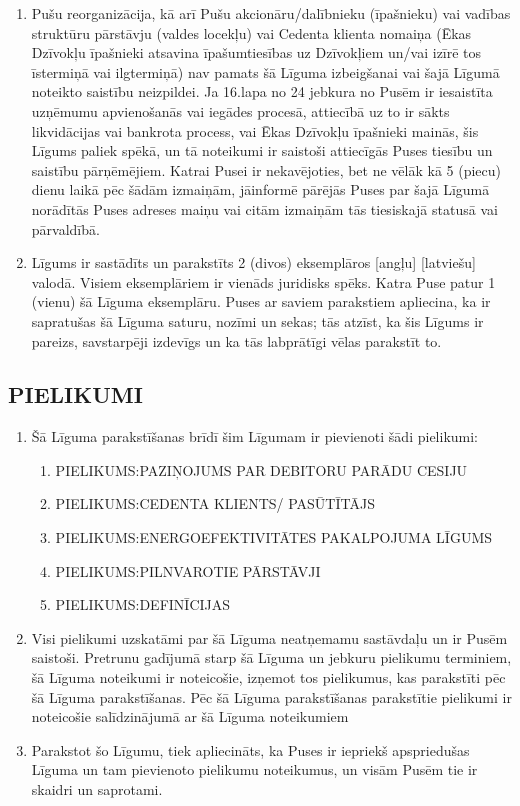\documentclass[a4paper]{article}
\begin{document}
\begin{multicols}{2}
\begin{enumerate}
  \item{Pušu reorganizācija, kā arī Pušu akcionāru/dalībnieku (īpašnieku) vai
vadības struktūru pārstāvju (valdes locekļu) vai Cedenta klienta
nomaiņa (Ēkas Dzīvokļu īpašnieki atsavina īpašumtiesības uz
Dzīvokļiem un/vai izīrē tos īstermiņā vai ilgtermiņā) nav pamats šā
Līguma izbeigšanai vai šajā Līgumā noteikto saistību neizpildei. Ja
16.lapa no 24 jebkura no Pusēm ir iesaistīta uzņēmumu apvienošanās vai iegādes
procesā, attiecībā uz to ir sākts likvidācijas vai bankrota process, vai
Ēkas Dzīvokļu īpašnieki mainās, šis Līgums paliek spēkā, un tā
noteikumi ir saistoši attiecīgās Puses tiesību un saistību
pārņēmējiem. Katrai Pusei ir nekavējoties, bet ne vēlāk kā 5 (piecu)
dienu laikā pēc šādām izmaiņām, jāinformē pārējās Puses par šajā
Līgumā norādītās Puses adreses maiņu vai citām izmaiņām tās
tiesiskajā statusā vai pārvaldībā.}

    \item{Līgums ir sastādīts un parakstīts 2 (divos) eksemplāros [angļu]
[latviešu] valodā. Visiem eksemplāriem ir vienāds juridisks spēks.
Katra Puse patur 1 (vienu) šā Līguma eksemplāru. Puses ar saviem
parakstiem apliecina, ka ir sapratušas šā Līguma saturu, nozīmi un
sekas; tās atzīst, ka šis Līgums ir pareizs, savstarpēji izdevīgs un ka tās
labprātīgi vēlas parakstīt to.}
  \end{enumerate}

  \subsection{PIELIKUMI}

  \begin{enumerate}
  \item{Šā Līguma parakstīšanas brīdī šim Līgumam ir pievienoti šādi  pielikumi:}
   \begin{enumerate}
	\item{PIELIKUMS:PAZIŅOJUMS PAR DEBITORU PARĀDU CESIJU}
	\item{PIELIKUMS:CEDENTA KLIENTS/ PASŪTĪTĀJS}
	\item{ PIELIKUMS:ENERGOEFEKTIVITĀTES PAKALPOJUMA LĪGUMS}
	\item{PIELIKUMS:PILNVAROTIE PĀRSTĀVJI}
	\item{PIELIKUMS:DEFINĪCIJAS}
    \end{enumerate}

  \item{Visi pielikumi uzskatāmi par šā Līguma neatņemamu sastāvdaļu un ir
Pusēm saistoši. Pretrunu gadījumā starp šā Līguma un jebkuru
pielikumu terminiem, šā Līguma noteikumi ir noteicošie, izņemot tos
pielikumus, kas parakstīti pēc šā Līguma parakstīšanas. Pēc šā Līguma
parakstīšanas parakstītie pielikumi ir noteicošie salīdzinājumā ar šā
Līguma noteikumiem}

  \item{Parakstot šo Līgumu, tiek apliecināts, ka Puses ir iepriekš
apspriedušas Līguma un tam pievienoto pielikumu noteikumus, un
visām Pusēm tie ir skaidri un saprotami.}
  \end{enumerate}

\end{multicols}
\end{document}
